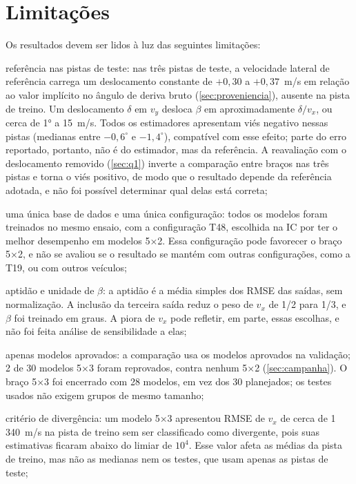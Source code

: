 \section{Limitações}\label{sec:limitacoes}

Os resultados devem ser lidos à luz das seguintes limitações:

\begin{alineas}
    \item referência nas pistas de teste: nas três pistas de teste, a velocidade lateral de referência carrega um deslocamento constante de $+0{,}30$ a $+0{,}37$~m/s em relação ao valor implícito no ângulo de deriva bruto (\autoref{sec:proveniencia}), ausente na pista de treino. Um deslocamento $\delta$ em $v_y$ desloca $\beta$ em aproximadamente $\delta/v_x$, ou cerca de 1° a 15~m/s. Todos os estimadores apresentam viés negativo nessas pistas (medianas entre $-0{,}6^\circ$ e $-1{,}4^\circ$), compatível com esse efeito; parte do erro reportado, portanto, não é do estimador, mas da referência. A reavaliação com o deslocamento removido (\autoref{sec:q1}) inverte a comparação entre braços nas três pistas e torna o viés positivo, de modo que o resultado depende da referência adotada, e não foi possível determinar qual delas está correta;
    \item uma única base de dados e uma única configuração: todos os modelos foram treinados no mesmo ensaio, com a configuração T48, escolhida na IC por ter o melhor desempenho em modelos 5×2. Essa configuração pode favorecer o braço 5×2, e não se avaliou se o resultado se mantém com outras configurações, como a T19, ou com outros veículos;
    \item aptidão e unidade de $\beta$: a aptidão é a média simples dos RMSE das saídas, sem normalização. A inclusão da terceira saída reduz o peso de $v_x$ de 1/2 para 1/3, e $\beta$ foi treinado em graus. A piora de $v_x$ pode refletir, em parte, essas escolhas, e não foi feita análise de sensibilidade a elas;
    \item apenas modelos aprovados: a comparação usa os modelos aprovados na validação; 2 de 30 modelos 5×3 foram reprovados, contra nenhum 5×2 (\autoref{sec:campanha}). O braço 5×3 foi encerrado com 28 modelos, em vez dos 30 planejados; os testes usados não exigem grupos de mesmo tamanho;
    \item critério de divergência: um modelo 5×3 apresentou RMSE de $v_x$ de cerca de 1\,340~m/s na pista de treino sem ser classificado como divergente, pois suas estimativas ficaram abaixo do limiar de $10^4$. Esse valor afeta as médias da pista de treino, mas não as medianas nem os testes, que usam apenas as pistas de teste;

\end{alineas}
